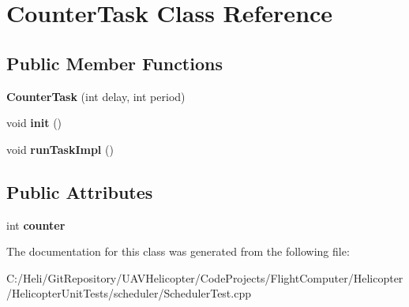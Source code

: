 \hypertarget{class_counter_task}{\section{Counter\-Task Class Reference}
\label{class_counter_task}
}
\subsection*{Public Member Functions}
\begin{DoxyCompactItemize}
\item 
\hypertarget{class_counter_task_adcd21bb87c6498bf4a620b6e2d1851f7}{{\bfseries Counter\-Task} (int delay, int period)}\label{class_counter_task_adcd21bb87c6498bf4a620b6e2d1851f7}

\item 
\hypertarget{class_counter_task_a58861509c1beb86258ffef9d51cb41f5}{void {\bfseries init} ()}\label{class_counter_task_a58861509c1beb86258ffef9d51cb41f5}

\item 
\hypertarget{class_counter_task_a41874fbad114b8ffcd20e59a9a501f3c}{void {\bfseries run\-Task\-Impl} ()}\label{class_counter_task_a41874fbad114b8ffcd20e59a9a501f3c}

\end{DoxyCompactItemize}
\subsection*{Public Attributes}
\begin{DoxyCompactItemize}
\item 
\hypertarget{class_counter_task_a24f215b91b944a6dfafa4d00d17f47be}{int {\bfseries counter}}\label{class_counter_task_a24f215b91b944a6dfafa4d00d17f47be}

\end{DoxyCompactItemize}


The documentation for this class was generated from the following file\-:\begin{DoxyCompactItemize}
\item 
C\-:/\-Heli/\-Git\-Repository/\-U\-A\-V\-Helicopter/\-Code\-Projects/\-Flight\-Computer/\-Helicopter/\-Helicopter\-Unit\-Tests/scheduler/Scheduler\-Test.\-cpp\end{DoxyCompactItemize}
